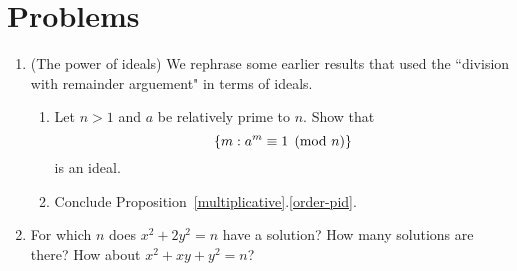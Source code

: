 \section{Problems}
\begin{enumerate}
\item \label{ideal-problems}(The power of ideals) We rephrase some earlier results that used the ``division with remainder arguement" in terms of ideals.
\begin{enumerate}
\item Let $n>1$ and $a$ be relatively prime to $n$. Show that
\[
\left\{{m}:{a^m\equiv 1\pmod n}\right\}
\]
is an ideal.
\item Conclude Proposition~\ref{multiplicative}.\ref{order-pid}.
\end{enumerate}
\item For which $n$ does $x^2+2y^2=n$ have a solution? How many solutions are there? How about $x^2+xy+y^2=n$?
\end{enumerate}